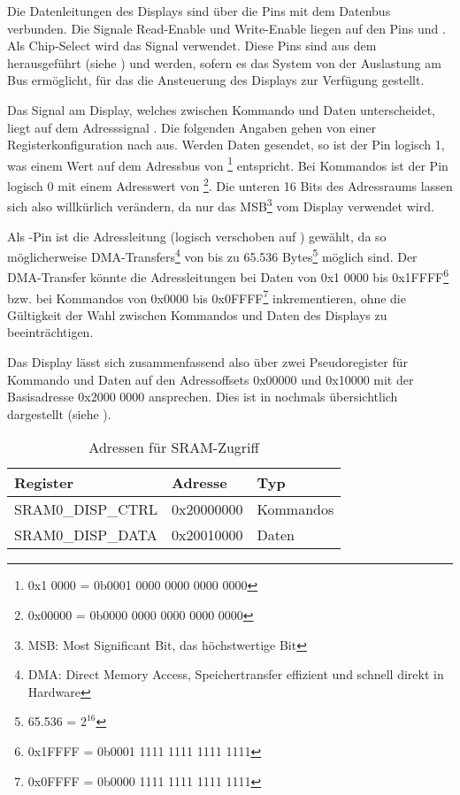 Die Datenleitungen des Displays sind über die Pins  mit dem Datenbus verbunden. Die Signale Read-Enable  und Write-Enable  liegen auf den Pins  und . Als Chip-Select wird das Signal  verwendet. Diese Pins sind aus dem  herausgeführt (siehe ) und werden, sofern es das System von der Auslastung am Bus ermöglicht, für das die Ansteuerung des Displays zur Verfügung gestellt.

Das  Signal am Display, welches zwischen Kommando und Daten unterscheidet, liegt auf dem Adresssignal . Die folgenden Angaben gehen von einer Registerkonfiguration nach  aus. Werden Daten gesendet, so ist der Pin logisch 1, was einem Wert auf dem Adressbus von \footnote{0x1 0000 = 0b0001 0000 0000 0000 0000} entspricht. Bei Kommandos ist der Pin logisch 0 mit einem Adresswert von \footnote{0x00000 = 0b0000 0000 0000 0000 0000}. Die unteren 16 Bits des Adressraums lassen sich also willkürlich verändern, da nur das MSB\footnote{MSB: Most Significant Bit, das höchstwertige Bit} vom Display verwendet wird. 

Als -Pin ist die Adressleitung  (logisch verschoben auf ) gewählt, da so möglicherweise DMA-Transfers\footnote{DMA: Direct Memory Access, Speichertransfer effizient und schnell direkt in Hardware} von bis zu 65.536 Bytes\footnote{65.536 = $2^{16}$} möglich sind. Der DMA-Transfer könnte die Adressleitungen bei Daten von 0x1 0000 bis 0x1FFFF\footnote{0x1FFFF = 0b0001 1111 1111 1111 1111} bzw. bei Kommandos von 0x0000 bis 0x0FFFF\footnote{0x0FFFF = 0b0000 1111 1111 1111 1111} inkrementieren, ohne die Gültigkeit der Wahl zwischen Kommandos und Daten des Displays zu beeinträchtigen.

Das Display lässt sich zusammenfassend also über zwei Pseudoregister für Kommando und Daten auf den Adressoffsets 0x00000 und 0x10000 mit der Basisadresse 0x2000 0000 ansprechen. Dies ist in  nochmals übersichtlich dargestellt (siehe \cite{NXP2010}).

\begin{table}[h]
\begin{tabular}{|p{4.5cm}|p{4cm}|p{4cm}|}\hline
\rowcolor{TableBackgroundColor} 
	\textbf{Register} 	& \textbf{Adresse} 	& \textbf{Typ} 			\\ \hline
	SRAM0\_DISP\_CTRL 	& 0x20000000		& Kommandos				\\ \hline
	SRAM0\_DISP\_DATA 	& 0x20010000 		& Daten 				\\ \hline
\end{tabular}
\caption{Adressen für SRAM-Zugriff}
\label{tab:sram_adressen}
\end{table}


